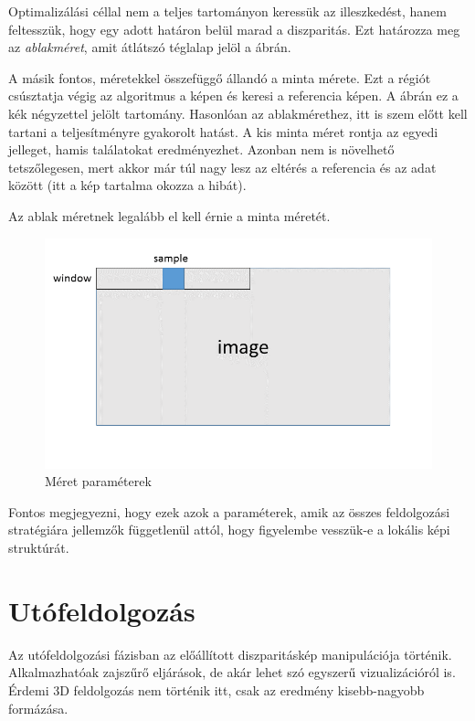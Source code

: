 Optimalizálási céllal nem a teljes tartományon keressük az illeszkedést, hanem feltesszük, hogy egy adott határon belül marad a diszparitás.
Ezt határozza meg az \emph{ablakméret}, amit átlátszó téglalap jelöl a  ábrán.

A másik fontos, méretekkel összefüggő állandó a minta mérete.
Ezt a régiót csúsztatja végig az algoritmus a képen és keresi a referencia képen.
A  ábrán ez a kék négyzettel jelölt tartomány.
Hasonlóan az ablakmérethez, itt is szem előtt kell tartani a teljesítményre gyakorolt hatást.
A kis minta méret rontja az egyedi jelleget, hamis találatokat eredményezhet.
Azonban nem is növelhető tetszőlegesen, mert akkor már túl nagy lesz az eltérés a referencia és az adat között (itt a kép tartalma okozza a hibát).

Az ablak méretnek legalább el kell érnie a minta méretét.

\begin{figure}[ht!]
	\centering
	\includegraphics[width=0.7\linewidth]{figures/sizeParams.png}
	\caption{Méret paraméterek}
	\label{fig:sizeParams}
\end{figure}

Fontos megjegyezni, hogy ezek azok a paraméterek, amik az összes feldolgozási stratégiára jellemzők függetlenül attól, hogy figyelembe vesszük-e a lokális képi struktúrát.

\section{Utófeldolgozás}\label{sect:Postproc}

Az utófeldolgozási fázisban az előállított diszparitáskép manipulációja történik.
Alkalmazhatóak zajszűrő eljárások, de akár lehet szó egyszerű vizualizációról is.
Érdemi 3D feldolgozás nem történik itt, csak az eredmény kisebb-nagyobb formázása.

